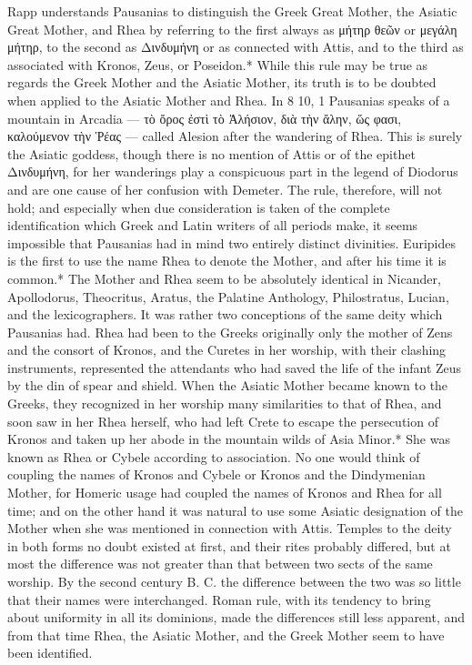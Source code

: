 \documentclass[a4paper, 11pt, oneside, polutonikogreek, english]{article}
\begin{document}
Rapp understands Pausanias to distinguish the Greek Great Mother, the Asiatic Great Mother, and Rhea by referring to the first always as μήτηρ θεῶν or μεγάλη μήτηρ, to the second as Δινδυμήνη or as connected with Attis, and to the third as associated with Kronos, Zeus, or Poseidon.* While this rule may be true as regards the Greek Mother and the Asiatic Mother, its truth is to be doubted when applied to the Asiatic Mother and Rhea. In 8 10, 1 Pausanias speaks of a mountain in Arcadia --- τὸ ὄρος ἐστὶ τὸ Ἀλήσιον, διὰ τὴν ἄλην, ὥς φασι, καλούμενον τὴν Ῥέας --- called Alesion after the wandering of Rhea. This is surely the Asiatic goddess, though there is no mention of Attis or of the epithet Δινδυμήνη, for her wanderings play a conspicuous part in the legend of Diodorus and are one cause of her confusion with Demeter. The rule, therefore, will not hold; and especially when due consideration is taken of the complete identification which Greek and Latin writers of all periods make, it seems impossible that Pausanias had in mind two entirely distinct divinities. Euripides is the first to use the name Rhea to denote the Mother, and after his time it is common.* The Mother and Rhea seem to be absolutely identical in Nicander, Apollodorus, Theocritus, Aratus, the Palatine Anthology, Philostratus, Lucian, and the lexicographers. It was rather two conceptions of the same deity which Pausanias had. Rhea had been to the Greeks originally only the mother of Zens and the consort of Kronos, and the Curetes in her worship, with their clashing instruments, represented the attendants who had saved the life of the infant Zeus by the din of spear and shield. When the Asiatic Mother became known to the Greeks, they recognized in her worship many similarities to that of Rhea, and soon saw in her Rhea herself, who had left Crete to escape the persecution of Kronos and taken up her abode in the mountain wilds of Asia Minor.* She was known as Rhea or Cybele according to association. No one would think of coupling the names of Kronos and Cybele or Kronos and the Dindymenian Mother, for Homeric usage had coupled the names of Kronos and Rhea for all time; and on the other hand it was natural to use some Asiatic designation of the Mother when she was mentioned in connection with Attis. Temples to the deity in both forms no doubt existed at first, and their rites probably differed, but at most the difference was not greater than that between two sects of the same worship. By the second century B. C. the difference between the two was so little that their names were interchanged. Roman rule, with its tendency to bring about uniformity in all its dominions, made the differences still less apparent, and from that time Rhea, the Asiatic Mother, and the Greek Mother seem to have been identified.
\end{document}
